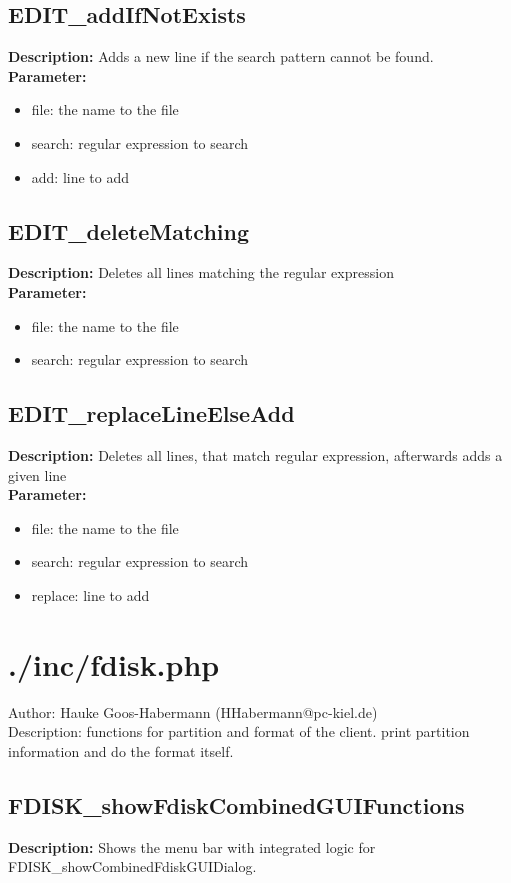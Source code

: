 \subsection{EDIT\_addIfNotExists}
\textbf{Description:} Adds a new line if the search pattern cannot be found.\\
\textbf{Parameter:}
\begin{itemize}
\item file: the name to the file
\item search: regular expression to search
\item add: line to add
\end{itemize}

\subsection{EDIT\_deleteMatching}
\textbf{Description:} Deletes all lines matching the regular expression\\
\textbf{Parameter:}
\begin{itemize}
\item file: the name to the file
\item search: regular expression to search
\end{itemize}

\subsection{EDIT\_replaceLineElseAdd}
\textbf{Description:} Deletes all lines, that match regular expression, afterwards adds a given line\\
\textbf{Parameter:}
\begin{itemize}
\item file: the name to the file
\item search: regular expression to search
\item replace: line to add
\end{itemize}

\newpage\section{./inc/fdisk.php}
 Author: Hauke Goos-Habermann (HHabermann@pc-kiel.de)\\
 Description: functions for partition and format of the client. print partition information and do the format itself.\\

\subsection{FDISK\_showFdiskCombinedGUIFunctions}
\textbf{Description:} Shows the menu bar with integrated logic for FDISK\_showCombinedFdiskGUIDialog.\\


